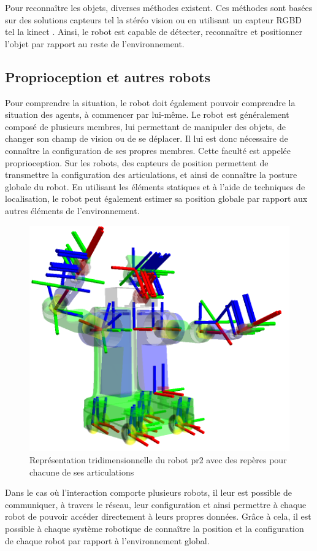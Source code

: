 \documentclass[a4paper,11pt,twoside]{StyleThese}
\begin{document}
Pour reconnaître les objets, diverses méthodes existent. Ces méthodes sont basées sur des solutions capteurs tel la stéréo vision \cite{murphy2005}
ou en utilisant un capteur RGBD tel la kinect \cite{tang2012}.
Ainsi, le robot est capable de détecter, reconnaître et positionner l'objet par rapport au reste de l'environnement.


\subsection{Proprioception et autres robots}
Pour comprendre la situation, le robot doit également pouvoir comprendre la situation des agents, à commencer par lui-même. Le robot est généralement composé de plusieurs membres, lui permettant de manipuler des objets, de changer son champ de vision ou de se déplacer. Il lui est donc nécessaire de connaître la configuration de ses propres membres. Cette faculté est appelée proprioception. Sur les robots, des capteurs de position permettent de transmettre la configuration des articulations, et ainsi de connaître la posture globale du robot. En utilisant les éléments statiques et à l'aide de techniques de localisation,
le robot peut également estimer sa position globale par rapport aux autres éléments de l'environnement.

\begin{figure}[ht!]
 \centering
  \includegraphics[width=0.59\linewidth]{./img/frames2.png} 
  \caption {Représentation tridimensionnelle du robot pr2 avec des repères pour chacune de ses articulations}
  \label{fig:frames}
\end{figure}

Dans le cas où l'interaction comporte plusieurs robots, il leur est possible de communiquer, à travers le réseau, leur configuration et ainsi permettre à chaque robot de pouvoir accéder directement à leurs propres données. Grâce à cela, il est possible à chaque système robotique de connaître la position et la configuration de chaque robot par rapport à l'environnement global.
\end{document}
